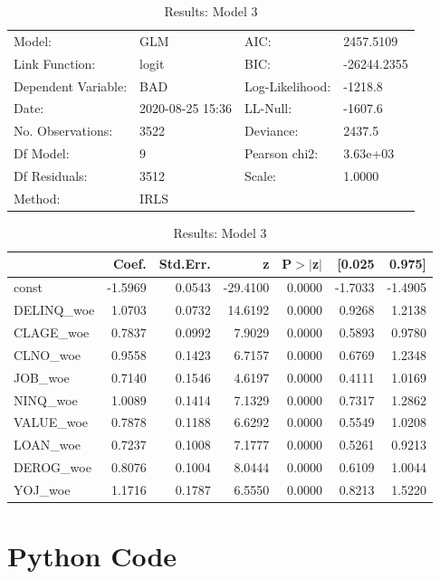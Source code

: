 \begin{appendices}
\begin{table}
\renewcommand{\arraystretch}{1.25}
\begin{center}
\begin{tabular}{llll}
\hline
Model:              & GLM              & AIC:            & 2457.5109    \\
Link Function:      & logit            & BIC:            & -26244.2355  \\
Dependent Variable: & BAD              & Log-Likelihood: & -1218.8      \\
Date:               & 2020-08-25 15:36 & LL-Null:        & -1607.6      \\
No. Observations:   & 3522             & Deviance:       & 2437.5       \\
Df Model:           & 9                & Pearson chi2:   & 3.63e+03     \\
Df Residuals:       & 3512             & Scale:          & 1.0000       \\
Method:             & IRLS             &                 &              \\
\hline
\end{tabular}
\end{center}
\begin{center}
\begin{tabular}{lrrrrrr}
\hline
            &  Coef.  & Std.Err. &    z     & P$> |$z$|$ &  [0.025 &  0.975]  \\
\hline
\hline
const       & -1.5969 &   0.0543 & -29.4100 &      0.0000 & -1.7033 & -1.4905  \\
DELINQ\_woe &  1.0703 &   0.0732 &  14.6192 &      0.0000 &  0.9268 &  1.2138  \\
CLAGE\_woe  &  0.7837 &   0.0992 &   7.9029 &      0.0000 &  0.5893 &  0.9780  \\
CLNO\_woe   &  0.9558 &   0.1423 &   6.7157 &      0.0000 &  0.6769 &  1.2348  \\
JOB\_woe    &  0.7140 &   0.1546 &   4.6197 &      0.0000 &  0.4111 &  1.0169  \\
NINQ\_woe   &  1.0089 &   0.1414 &   7.1329 &      0.0000 &  0.7317 &  1.2862  \\
VALUE\_woe  &  0.7878 &   0.1188 &   6.6292 &      0.0000 &  0.5549 &  1.0208  \\
LOAN\_woe   &  0.7237 &   0.1008 &   7.1777 &      0.0000 &  0.5261 &  0.9213  \\
DEROG\_woe  &  0.8076 &   0.1004 &   8.0444 &      0.0000 &  0.6109 &  1.0044  \\
YOJ\_woe    &  1.1716 &   0.1787 &   6.5550 &      0.0000 &  0.8213 &  1.5220  \\
\hline
\end{tabular}
\end{center}
\caption{Results: Model 3}
\end{table}

\chapter{Python Code}

\end{appendices}
